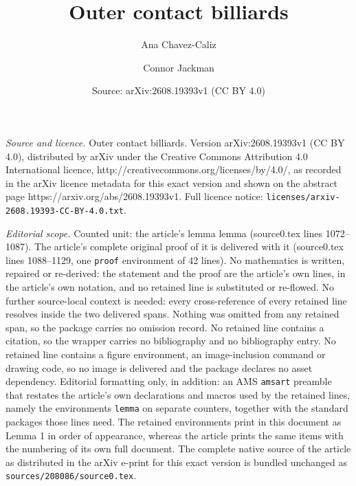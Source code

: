 \documentclass[10pt,a4paper]{amsart}
\title{Outer contact billiards}
\author{Ana Chavez-Caliz \and Connor Jackman}
\date{Source: arXiv:2608.19393v1 (CC BY 4.0)}
\begin{document}
\maketitle

\noindent\emph{Source and licence.} Outer contact billiards. Version arXiv:2608.19393v1 (CC BY 4.0), distributed by arXiv under the Creative Commons Attribution 4.0 International licence, http://creativecommons.org/licenses/by/4.0/, as recorded in the arXiv licence metadata for this exact version and shown on the abstract page https://arxiv.org/abs/2608.19393v1. Full licence notice: \texttt{licenses/arxiv-2608.19393-CC-BY-4.0.txt}.\par\smallskip

\noindent\textit{Editorial scope.} Counted unit: the article's lemma lemma (source0.tex lines 1072--1087). The article's complete original proof of it is delivered with it (source0.tex lines 1088--1129, one \texttt{proof} environment of 42 lines). No mathematics is written, repaired or re-derived: the statement and the proof are the article's own lines, in the article's own notation, and no retained line is substituted or re-flowed.  No further source-local context is needed: every cross-reference of every retained line resolves inside the two delivered spans.  Nothing was omitted from any retained span, so the package carries no omission record.  No retained line contains a citation, so the wrapper carries no bibliography and no bibliography entry.  No retained line contains a figure environment, an image-inclusion command or drawing code, so no image is delivered and the package declares no asset dependency.  Editorial formatting only, in addition: an AMS \texttt{amsart} preamble that restates the article's own declarations and macros used by the retained lines, namely the environments \texttt{lemma} on separate counters, together with the standard packages those lines need.  The retained environments print in this document as Lemma 1 in order of appearance, whereas the article prints the same items with the numbering of its own full document.  The complete native source of the article as distributed in the arXiv e-print for this exact version is bundled unchanged as \texttt{sources/208086/source0.tex}.
\end{document}
